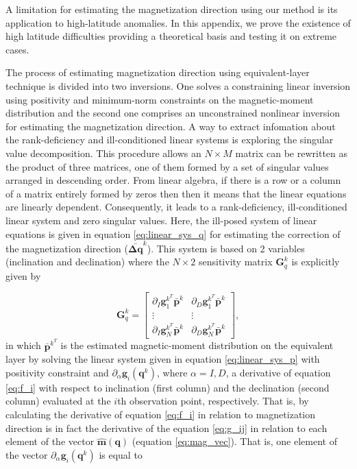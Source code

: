 
A limitation for estimating the magnetization direction using our method is its application to high-latitude anomalies. In this appendix, we prove the existence of high latitude difficulties providing a theoretical basis and testing it on extreme cases.

The process of estimating magnetization direction using equivalent-layer technique is divided into two inversions. One solves a constraining linear inversion using positivity and minimum-norm constraints on the magnetic-moment distribution and the second one comprises an unconstrained nonlinear inversion for estimating the magnetization direction. A way to extract infomation about the rank-deficiency and ill-conditioned linear systems is exploring the singular value decomposition. This procedure allows an $N \times M$ matrix can be rewritten as the product of three matrices, one of them formed by a set of singular values arranged in descending order. From linear algebra, if there is a row or a column of a matrix entirely formed by zeros then then it means that the linear equations are linearly dependent. Consequently, it leads to a rank-deficiency, ill-conditioned linear system and zero singular values. Here, the ill-posed system of linear equations is given in equation \ref{eq:linear_sys_q} for estimating the correction of the magnetization direction ($\bar{\mathbf{\Delta q}}^{k}$). This system is based on 2 variables (inclination and declination) where the $N \times 2$ sensitivity matrix $\mathbf{G}_{q}^{k}$ is explicitly given by

\begin{equation}
\mathbf{G}_{q}^{k} =
\left[ \begin{array}{cc}
\partial_{I} \mathbf{g}_{1}^{k^T} \bar{\mathbf{p}}^{k}   & \partial_{D} \mathbf{g}_{1}^{k^T} \bar{\mathbf{p}}^{k} \\
\vdots & \vdots  \\
\partial_{I} \mathbf{g}_{N}^{k^T} \bar{\mathbf{p}}^{k}   & \partial_{D} \mathbf{g}_{N}^{k^T} \bar{\mathbf{p}}^{k} 
\end{array} \right] ,
\label{eq:gp}
\end{equation}
in which $\bar{\mathbf{p}}^{k^T}$ is the estimated magnetic-moment distribution on the equivalent layer by solving the linear system given in equation \ref{eq:linear_sys_p} with positivity constraint and $\partial_{\alpha}\mathbf{g}_{i} (\mathbf{q}^k)$, where $\alpha= I, D$, a derivative of equation \ref{eq:f_i} with respect to inclination (first column) and the declination (second column) evaluated at the $i$th observation point, respectively. That is, by calculating the derivative of equation \ref{eq:f_i} in relation to magnetization direction is in fact the derivative of the equation \ref{eq:g_ij} in relation to each element of the vector $\hat{\mathbf{m}}(\mathbf{q})$ (equation \ref{eq:mag_vec}). That is, one element of the vector $\partial_{\alpha}\mathbf{g}_{i} (\mathbf{q}^k)$ is equal to 



